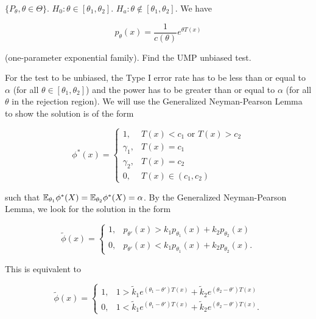 \begin{example}\label{mathstats.gnp.ex.prob}

\(\{P_\theta, \theta \in \Theta\}\). \(H_0: \theta \in [\theta_1, \theta_2]\). \(H_a: \theta \notin [\theta_1, \theta_2]\). We have 

\[
p_\theta(x) =  \frac{1}{c(\theta)} e^{\theta T(x)}
\]

(one-parameter exponential family). Find the UMP unbiased test.

\end{example}

\begin{solution}

For the test to be unbiased, the Type I error rate has to be less than or equal to \(\alpha\) (for all \(\theta \in [\theta_1, \theta_2]\)) and the power has to be greater than or equal to \(\alpha\) (for all \(\theta\) in the rejection region). We will use the Generalized Neyman-Pearson Lemma to show the solution is of the form

\[
\phi^*(x) = \begin{cases}
1, & T(x) < c_1 \text{ or } T(x) > c_2 \\
\gamma_1, & T(x) = c_1 \\
\gamma_2, & T(x) = c_2 \\
0, & T(x) \in (c_1, c_2)
\end{cases}
\]

such that \(\E_{\theta_1} \phi^*(X) = \E_{\theta_2} \phi^*(X) = \alpha\). By the Generalized Neyman-Pearson Lemma, we look for the solution in the form

\[
\tilde{\phi}(x) = \begin{cases}
1, & p_{\theta'}(x) > k_1  p_{\theta_1}(x) + k_2 p_{\theta_2}(x) \\
0, & p_{\theta'}(x) < k_1  p_{\theta_1}(x) + k_2 p_{\theta_2}(x).
\end{cases}
\]

This is equivalent to 

\begin{equation}\label{mathstats.np.gen.ex.a}
\tilde{\phi}(x) = \begin{cases}
1, & 1 > \tilde{k}_1e^{(\theta_1 - \theta') T(x)} + \tilde{k}_2e^{(\theta_2  - \theta') T(x)} \\
0, & 1 < \tilde{k}_1e^{(\theta_1 - \theta') T(x)} + \tilde{k}_2e^{(\theta_2  - \theta') T(x)}.
\end{cases}
\end{equation}


\end{solution}
